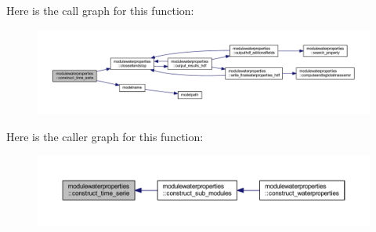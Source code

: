 Here is the call graph for this function\+:\nopagebreak
\begin{figure}[H]
\begin{center}
\leavevmode
\includegraphics[width=350pt]{namespacemodulewaterproperties_a0067cb435852460b42999329f0637ab7_cgraph}
\end{center}
\end{figure}
Here is the caller graph for this function\+:\nopagebreak
\begin{figure}[H]
\begin{center}
\leavevmode
\includegraphics[width=350pt]{namespacemodulewaterproperties_a0067cb435852460b42999329f0637ab7_icgraph}
\end{center}
\end{figure}
\mbox{\label{namespacemodulewaterproperties_a4b5a43f1052c697cd24d266317cd9be5}} 
